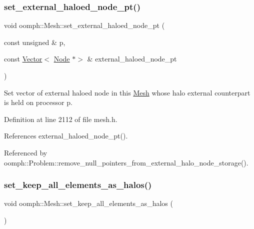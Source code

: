 \subsubsection{\texorpdfstring{set\+\_\+external\+\_\+haloed\+\_\+node\+\_\+pt()}{set\_external\_haloed\_node\_pt()}}
{\footnotesize\ttfamily void oomph\+::\+Mesh\+::set\+\_\+external\+\_\+haloed\+\_\+node\+\_\+pt (\begin{DoxyParamCaption}\item[{const unsigned \&}]{p,  }\item[{const \hyperlink{classoomph_1_1Vector}{Vector}$<$ \hyperlink{classoomph_1_1Node}{Node} $\ast$$>$ \&}]{external\+\_\+haloed\+\_\+node\+\_\+pt }\end{DoxyParamCaption})\hspace{0.3cm}{\ttfamily [inline]}}



Set vector of external haloed node in this \hyperlink{classoomph_1_1Mesh}{Mesh} whose halo external counterpart is held on processor p. 



Definition at line 2112 of file mesh.\+h.



References external\+\_\+haloed\+\_\+node\+\_\+pt().



Referenced by oomph\+::\+Problem\+::remove\+\_\+null\+\_\+pointers\+\_\+from\+\_\+external\+\_\+halo\+\_\+node\+\_\+storage().

\mbox{\label{classoomph_1_1Mesh_a21a502b283ad962d3999a9f347484f38}} 
\subsubsection{\texorpdfstring{set\+\_\+keep\+\_\+all\+\_\+elements\+\_\+as\+\_\+halos()}{set\_keep\_all\_elements\_as\_halos()}}
{\footnotesize\ttfamily void oomph\+::\+Mesh\+::set\+\_\+keep\+\_\+all\+\_\+elements\+\_\+as\+\_\+halos (\begin{DoxyParamCaption}{ }\end{DoxyParamCaption})\hspace{0.3cm}{\ttfamily [inline]}}



